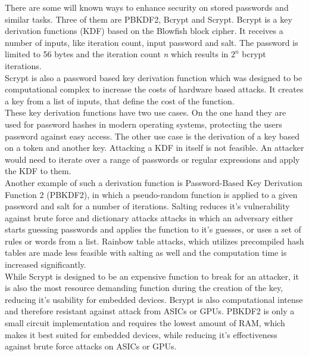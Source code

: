         There are some will known ways to enhance security on stored passwords and similar tasks. Three of them are PBKDF2\cite{kaliski_pkcs_2000}, Bcrypt\cite{provos_future-adaptable_1999} and Scrypt\cite{josefsson_scrypt_2016}.
        Bcrypt is a key derivation functions (KDF) based on the Blowfish block cipher. It receives a number of inputs, like iteration count, input password and salt. The password is limited to 56 bytes and the iteration count \textit{n} which results in $2^n$ bcrypt iterations\cite{hatzivasilis_password_2015-1}\cite{provos_future-adaptable_1999}.\\
        Scrypt is also a password based key derivation function which was designed to be computational complex to increase the costs of hardware based attacks. It creates a key from a list of inputs, that define the cost of the function.\\
        These key derivation functions have two use cases. On the one hand they are used for password hashes in modern operating systems, protecting the users password against easy access\cite{percival_stronger_nodate}. 
        The other use case is the derivation of a key based on a token and another key\cite{camenisch_privacy_2011}. Attacking a KDF in itself is not feasible. An attacker would need to iterate over a range of passwords or regular expressions and apply the KDF to them\cite{percival_stronger_nodate}.\\
        Another example of such a derivation function is Password-Based Key Derivation Function 2 (PBKDF2), in which a pseudo-random function is applied to a given password and salt for a number of iterations. 
        Salting reduces it's vulnerability against brute force and dictionary attacks attacks in which an adversary either starts guessing passwords and applies the function to it's guesses, or uses a set of rules or words from a list. Rainbow table attacks, which utilizes precompiled hash tables are made less feasible with salting as well and the computation time is increased significantly\cite{kaliski_bkaliskirsasecuritycom_pkcs_2000}. \\
        While Scrypt is designed to be an expensive function to break for an attacker, it is also the most resource demanding function during the creation of the key, reducing it's usability for embedded devices. Bcrypt is also computational intense and therefore resistant against attack from ASICs or GPUs. PBKDF2 is only a small circuit implementation and requires the lowest amount of RAM, which makes it best suited for embedded devices, while reducing it's effectiveness against brute force attacks on ASICs or GPUs\cite{hatzivasilis_password_2015-1}.\\


